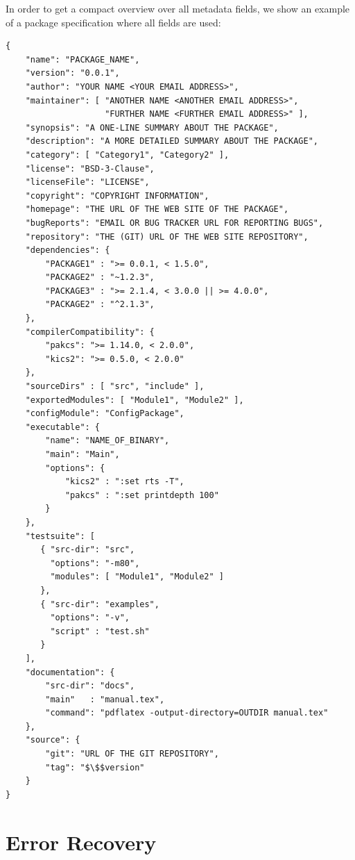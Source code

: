 \documentclass[11pt]{article}
\begin{document}
%
In order to get a compact overview over all metadata fields,
we show an example of a package specification where all fields
are used:
%
\begin{lstlisting}
{
    "name": "PACKAGE_NAME",
    "version": "0.0.1",
    "author": "YOUR NAME <YOUR EMAIL ADDRESS>",
    "maintainer": [ "ANOTHER NAME <ANOTHER EMAIL ADDRESS>",
                    "FURTHER NAME <FURTHER EMAIL ADDRESS>" ],
    "synopsis": "A ONE-LINE SUMMARY ABOUT THE PACKAGE",
    "description": "A MORE DETAILED SUMMARY ABOUT THE PACKAGE",
    "category": [ "Category1", "Category2" ],
    "license": "BSD-3-Clause",
    "licenseFile": "LICENSE",
    "copyright": "COPYRIGHT INFORMATION",
    "homepage": "THE URL OF THE WEB SITE OF THE PACKAGE",
    "bugReports": "EMAIL OR BUG TRACKER URL FOR REPORTING BUGS",
    "repository": "THE (GIT) URL OF THE WEB SITE REPOSITORY",
    "dependencies": {
        "PACKAGE1" : ">= 0.0.1, < 1.5.0",
        "PACKAGE2" : "~1.2.3",
        "PACKAGE3" : ">= 2.1.4, < 3.0.0 || >= 4.0.0",
        "PACKAGE2" : "^2.1.3",
    },
    "compilerCompatibility": {
        "pakcs": ">= 1.14.0, < 2.0.0",
        "kics2": ">= 0.5.0, < 2.0.0"
    },
    "sourceDirs" : [ "src", "include" ],
    "exportedModules": [ "Module1", "Module2" ],
    "configModule": "ConfigPackage",
    "executable": {
        "name": "NAME_OF_BINARY",
        "main": "Main",
        "options": {
            "kics2" : ":set rts -T",
            "pakcs" : ":set printdepth 100"
        }
    },
    "testsuite": [
       { "src-dir": "src",
         "options": "-m80",
         "modules": [ "Module1", "Module2" ]
       },
       { "src-dir": "examples",
         "options": "-v",
         "script" : "test.sh"
       }
    ],
    "documentation": {
        "src-dir": "docs",
        "main"   : "manual.tex",
        "command": "pdflatex -output-directory=OUTDIR manual.tex"
    },
    "source": {
        "git": "URL OF THE GIT REPOSITORY",
        "tag": "$\$$version"
    }
}
\end{lstlisting}


\clearpage

\section{Error Recovery}
\label{sec:recovery}
\end{document}
